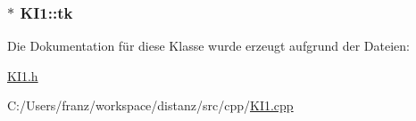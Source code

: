 \subsubsection[{tk}]{$\ast$ K\+I1\+::tk\hspace{0.3cm}{\ttfamily [private]}}\label{class_k_i1_a4c25d6f211ec7c1ad8979f36b3bd9275}


Die Dokumentation für diese Klasse wurde erzeugt aufgrund der Dateien\+:\begin{DoxyCompactItemize}
\item 
\hyperlink{_k_i1_8h}{K\+I1.\+h}\item 
C\+:/\+Users/franz/workspace/distanz/src/cpp/\hyperlink{_k_i1_8cpp}{K\+I1.\+cpp}\end{DoxyCompactItemize}
